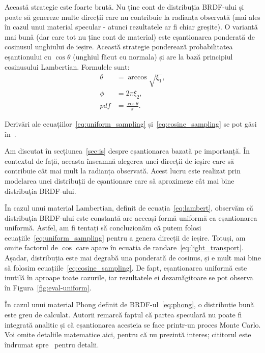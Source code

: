 \documentclass[12pt,a4paper]{report}
\numberwithin{equation}{section} %
\begin{document}
Această strategie este foarte brută. Nu ține cont de distribuția BRDF-ului și
poate să genereze multe direcții care nu contribuie la radianța observată (mai ales
în cazul unui material specular - atunci rezultatele ar fi chiar greșite). O variantă mai bună (dar care tot nu ține cont de material) este eșantionarea ponderată
de cosinusul unghiului de ieșire. Această strategie ponderează probabilitatea
eșantionului cu $\cos \theta$ (unghiul făcut cu normala) și are la bază principiul
cosinusului Lambertian. Formulele sunt:
\begin{equation}\label{eq:cosine_sampling}
	\begin{aligned}
		\theta & = \arccos \sqrt{\xi_1},    \\
		\phi   & = 2\pi \xi_2,              \\
		pdf    & = \frac{\cos \theta}{\pi}.
	\end{aligned}
\end{equation}

Derivări ale ecuațiilor~\ref{eq:uniform_sampling} și~\ref{eq:cosine_sampling} se pot găsi
în~\cite{sampling}.

Am discutat în secțiunea~\ref{sec:is} despre eșantionarea bazată pe importanță.
În contextul de față, aceasta înseamnă alegerea unei direcții de ieșire care să
contribuie cât mai mult la radianța observată. Acest lucru este realizat prin
modelarea unei distribuții de eșantionare care să aproximeze cât mai bine distribuția
BRDF-ului.

În cazul unui material Lambertian, definit de ecuația~\ref{eq:lambert}, observăm
că distribuția BRDF-ului este constantă are aceeași formă uniformă ca eșantionarea
uniformă. Astfel, am fi tentați să concluzionăm că putem folosi
ecuațiile~\ref{eq:uniform_sampling} pentru a genera direcții de ieșire. Totuși,
am omite factorul de $\cos$ care apare în ecuația de randare~\ref{eq:light_transport}.
Așadar, distribuția este mai degrabă una ponderată de cosinus, și e mult mai bine
să folosim ecuațiile~\ref{eq:cosine_sampling}. De fapt, eșantionarea uniformă este
inutilă în aproape toate cazurile, iar rezultatele ei dezamăgitoare se pot
observa în Figura~\ref{fig:eval-uniform}.

În cazul unui material Phong definit de BRDF-ul~\ref{eq:phong}, o distribuție
bună este greu de calculat. Autorii remarcă faptul că partea speculară nu poate
fi integrată analitic și că eșantionarea acesteia se face printr-un proces
Monte Carlo. Voi omite detaliile matematice aici, pentru că nu prezintă interes;
cititorul este îndrumat spre~\cite{Lafortune} pentru detalii.
\end{document}
